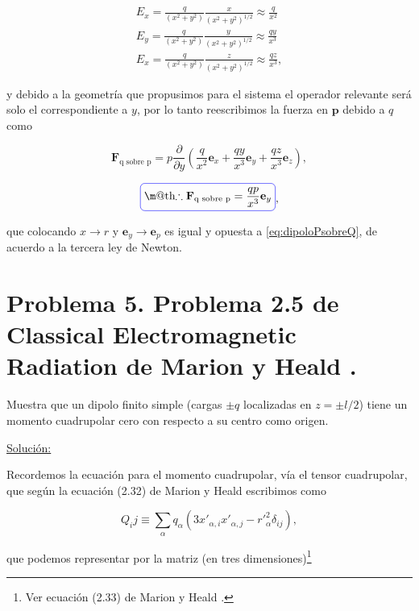 \documentclass[a4paper,11pt]{article}
\makeatletter
\numberwithin{equation}{section}
\newcommand*{\boxcolor}{blue}
\renewcommand{\boxed}[1]{\textcolor{\boxcolor}{%
\tikz[baseline={([yshift=-1ex]current bounding box.center)}] \node [rectangle, minimum width=1ex,rounded corners,draw] {\normalcolor\m@th$\displaystyle#1$};}}
\makeatother
\begin{document}
\begin{align*}
 E_x = \frac{q}{(x^2+y^2)}\frac{x}{(x^2+y^2)^{1/2}} \approx \frac{q}{x^2} \\
 E_y = \frac{q}{(x^2+y^2)}\frac{y}{(x^2+y^2)^{1/2}} \approx \frac{qy}{x^3} \\
 E_x = \frac{q}{(x^2+y^2)}\frac{z}{(x^2+y^2)^{1/2}} \approx \frac{qz}{x^3},
\end{align*}

y debido a la geometría que propusimos para el sistema el operador relevante 
será solo el correspondiente a $y$, por lo tanto reescribimos la fuerza en 
$\mathbf{p}$ debido a $q$ como 

\begin{equation}
 \mathbf{F}_{\text{q sobre p}} = p\frac{\partial}{\partial y}\left( \frac{q}{x^2} 
 \mathbf{e}_x + \frac{qy}{x^3}\mathbf{e}_y + \frac{qz}{x^3}\mathbf{e}_z\right),
\end{equation}
 
\begin{equation}
 \boxed{\therefore  \mathbf{F}_{\text{q sobre p}} = \frac{qp}{x^3}\mathbf{e}_y},
\end{equation}

que colocando $x \rightarrow r$ y $\mathbf{e}_y \rightarrow \mathbf{e}_p$ es igual y 
opuesta a \eqref{eq:dipoloPsobreQ}, de acuerdo a la tercera ley de Newton.

\section{Problema 5. Problema 2.5 de Classical Electromagnetic Radiation
de Marion y Heald \cite{marion2}.}

Muestra que un dipolo finito simple (cargas $\pm q$ localizadas en $z = \pm l/2$) 
tiene un momento cuadrupolar cero con respecto a su centro como origen.

\vspace{.3cm}

\underline{Solución:} \vspace{.3cm}

Recordemos la ecuación para el momento cuadrupolar, vía el tensor cuadrupolar, 
que según la ecuación (2.32) de Marion y Heald \cite{marion2} escribimos como 

\begin{equation}
 Q_ij \equiv \sum_\alpha q_\alpha(3x'_{\alpha,i}x'_{\alpha,j} - r'^2_\alpha\delta_{ij}),
\end{equation}

que podemos representar por la matriz (en tres dimensiones)\footnote{Ver ecuación 
(2.33) de Marion y Heald \cite{marion2}.}
\end{document}
